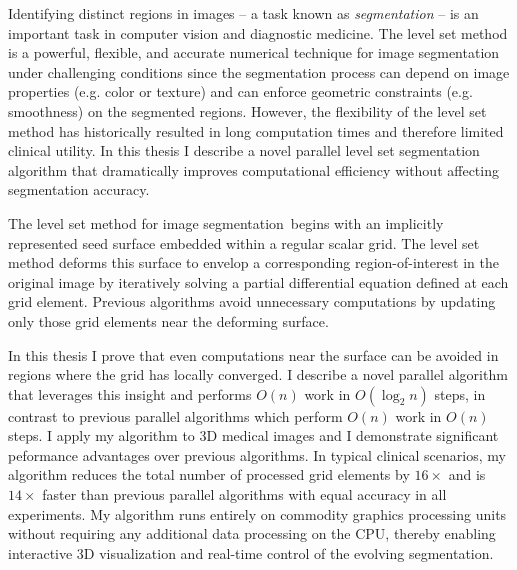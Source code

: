 \newpage
{}
{}

Identifying distinct regions in images -- a task known as \emph{segmentation} -- is an important task in computer vision and diagnostic medicine. The level set method is a powerful, flexible, and accurate numerical technique for image segmentation under challenging conditions since the segmentation process can depend on image properties (e.g. color or texture) and can enforce geometric constraints (e.g. smoothness) on the segmented regions. However, the flexibility of the level set method has historically resulted in long computation times and therefore limited clinical utility. In this thesis I describe a novel parallel level set segmentation algorithm that dramatically improves computational efficiency without affecting segmentation accuracy.

The level set method for image segmentation~begins with an implicitly represented seed surface embedded within a regular scalar grid. The level set method deforms this surface to envelop a corresponding region-of-interest in the original image by iteratively solving a partial differential equation defined at each grid element. Previous algorithms avoid unnecessary  computations by updating only those
grid elements near the deforming surface.

In this thesis I prove that even computations near the surface can be avoided in regions where the grid has locally converged. I describe a novel parallel algorithm  that leverages this insight and performs $O(n)$ work in $O(\log_2 n)$ steps, in contrast to previous parallel algorithms which perform  $O(n)$ work in $O(n)$ steps. I apply my algorithm to 3D medical images and I demonstrate significant peformance advantages over previous algorithms. In typical clinical scenarios, my algorithm reduces the total number of processed grid elements by $16 \times$ and is $14 \times$ faster than previous parallel algorithms with equal accuracy in all experiments. My algorithm runs entirely on commodity graphics processing units without requiring any additional data processing on the CPU, thereby enabling interactive 3D visualization and real-time control of the evolving segmentation.




